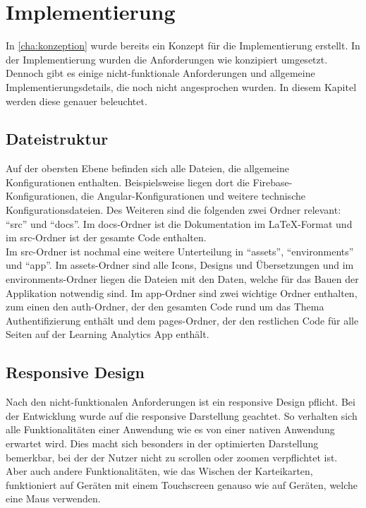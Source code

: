 \chapter{Implementierung}

In \autoref{cha:konzeption} wurde bereits ein Konzept für die Implementierung erstellt. In der Implementierung wurden die Anforderungen wie konzipiert umgesetzt.
Dennoch gibt es einige nicht-funktionale Anforderungen und allgemeine Implementierungsdetails, die noch nicht angesprochen wurden. In diesem Kapitel werden diese genauer beleuchtet.

\section{Dateistruktur}

Auf der obersten Ebene befinden sich alle Dateien, die allgemeine Konfigurationen enthalten. Beispielsweise liegen dort die Firebase-Konfigurationen, die Angular-Konfigurationen und 
weitere technische Konfigurationsdateien. Des Weiteren sind die folgenden zwei Ordner relevant: \enquote{src} und \enquote{docs}. Im docs-Ordner ist die Dokumentation im \LaTeX-Format 
und im src-Ordner ist der gesamte Code enthalten. \\
Im src-Ordner ist nochmal eine weitere Unterteilung in \enquote{assets}, \enquote{environments} und \enquote{app}. Im assets-Ordner sind alle Icons, Designs und Übersetzungen und im environments-Ordner 
liegen die Dateien mit den Daten, welche für das Bauen der Applikation notwendig sind. Im app-Ordner sind zwei wichtige Ordner enthalten, zum einen den auth-Ordner, der den gesamten Code rund um das 
Thema Authentifizierung enthält und dem pages-Ordner, der den restlichen Code für alle Seiten auf der Learning Analytics App enthält. \\

\section{Responsive Design} 
Nach den nicht-funktionalen Anforderungen ist ein responsive Design pflicht.  
Bei der Entwicklung wurde auf die responsive Darstellung geachtet.
So verhalten sich alle Funktionalitäten einer Anwendung wie es von einer nativen Anwendung erwartet wird.
Dies macht sich besonders in der optimierten Darstellung bemerkbar, bei der der Nutzer nicht zu scrollen oder zoomen verpflichtet ist.
Aber auch andere Funktionalitäten, wie das Wischen der Karteikarten, funktioniert auf Geräten mit einem Touchscreen genauso wie auf Geräten, welche eine Maus verwenden.

